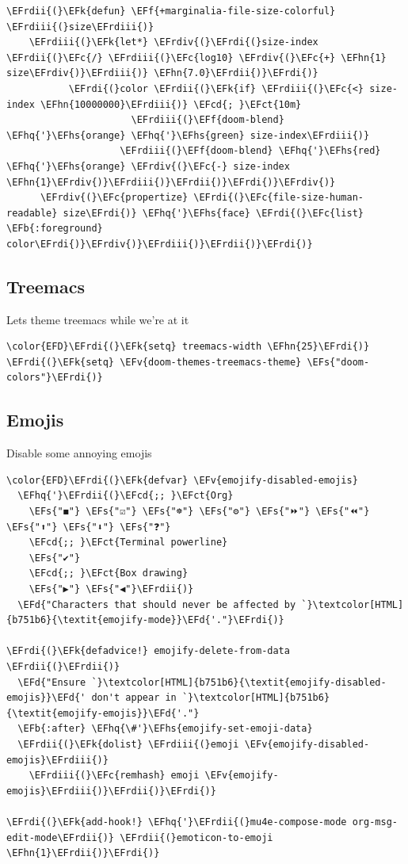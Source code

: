 \documentclass{scrartcl}
\newcommand{\EFk}[1]{\textcolor{EFk}{#1}} %
\newcommand{\EFd}[1]{\textcolor{EFd}{\textit{#1}}} %
\newcommand{\EFs}[1]{\textcolor{EFs}{#1}} %
\newcommand{\EFb}[1]{\textcolor{EFb}{#1}} %
\newcommand{\EFct}[1]{\textcolor{EFct}{#1}} %
\newcommand{\EFc}[1]{\textcolor{EFc}{#1}} %
\newcommand{\EFv}[1]{\textcolor{EFv}{#1}} %
\newcommand{\EFf}[1]{\textcolor{EFf}{#1}} %
\newcommand{\EFcd}[1]{\textcolor{EFcd}{#1}} %
\newcommand{\EFhn}[1]{\textcolor{EFhn}{\textbf{#1}}} %
\newcommand{\EFhq}[1]{\textcolor{EFhq}{#1}} %
\newcommand{\EFhs}[1]{\textcolor{EFhs}{#1}} %
\newcommand{\EFrdi}[1]{\textcolor{EFrdi}{#1}} %
\newcommand{\EFrdii}[1]{\textcolor{EFrdii}{#1}} %
\newcommand{\EFrdiii}[1]{\textcolor{EFrdiii}{#1}} %
\newcommand{\EFrdiv}[1]{\textcolor{EFrdiv}{#1}} %
\begin{document}
\begin{Code}
\begin{Verbatim}[]
  \EFrdii{(}\EFk{defun} \EFf{+marginalia-file-size-colorful} \EFrdiii{(}size\EFrdiii{)}
    \EFrdiii{(}\EFk{let*} \EFrdiv{(}\EFrdi{(}size-index \EFrdii{(}\EFc{/} \EFrdiii{(}\EFc{log10} \EFrdiv{(}\EFc{+} \EFhn{1} size\EFrdiv{)}\EFrdiii{)} \EFhn{7.0}\EFrdii{)}\EFrdi{)}
           \EFrdi{(}color \EFrdii{(}\EFk{if} \EFrdiii{(}\EFc{<} size-index \EFhn{10000000}\EFrdiii{)} \EFcd{; }\EFct{10m}
                      \EFrdiii{(}\EFf{doom-blend} \EFhq{'}\EFhs{orange} \EFhq{'}\EFhs{green} size-index\EFrdiii{)}
                    \EFrdiii{(}\EFf{doom-blend} \EFhq{'}\EFhs{red} \EFhq{'}\EFhs{orange} \EFrdiv{(}\EFc{-} size-index \EFhn{1}\EFrdiv{)}\EFrdiii{)}\EFrdii{)}\EFrdi{)}\EFrdiv{)}
      \EFrdiv{(}\EFc{propertize} \EFrdi{(}\EFc{file-size-human-readable} size\EFrdi{)} \EFhq{'}\EFhs{face} \EFrdi{(}\EFc{list} \EFb{:foreground} color\EFrdi{)}\EFrdiv{)}\EFrdiii{)}\EFrdii{)}\EFrdi{)}
\end{Verbatim}
\end{Code}

\subsection{Treemacs}
\label{sec:org0352200}
Lets theme treemacs while we're at it
\begin{Code}
\begin{Verbatim}[]
\color{EFD}\EFrdi{(}\EFk{setq} treemacs-width \EFhn{25}\EFrdi{)}
\EFrdi{(}\EFk{setq} \EFv{doom-themes-treemacs-theme} \EFs{"doom-colors"}\EFrdi{)}
\end{Verbatim}
\end{Code}

\subsection{Emojis}
\label{sec:org70b92b0}
Disable some annoying emojis
\begin{Code}
\begin{Verbatim}[]
\color{EFD}\EFrdi{(}\EFk{defvar} \EFv{emojify-disabled-emojis}
  \EFhq{'}\EFrdii{(}\EFcd{;; }\EFct{Org}
    \EFs{"◼"} \EFs{"☑"} \EFs{"☸"} \EFs{"⚙"} \EFs{"⏩"} \EFs{"⏪"} \EFs{"⬆"} \EFs{"⬇"} \EFs{"❓"}
    \EFcd{;; }\EFct{Terminal powerline}
    \EFs{"✔"}
    \EFcd{;; }\EFct{Box drawing}
    \EFs{"▶"} \EFs{"◀"}\EFrdii{)}
  \EFd{"Characters that should never be affected by `}\textcolor[HTML]{b751b6}{\textit{emojify-mode}}\EFd{'."}\EFrdi{)}

\EFrdi{(}\EFk{defadvice!} emojify-delete-from-data \EFrdii{(}\EFrdii{)}
  \EFd{"Ensure `}\textcolor[HTML]{b751b6}{\textit{emojify-disabled-emojis}}\EFd{' don't appear in `}\textcolor[HTML]{b751b6}{\textit{emojify-emojis}}\EFd{'."}
  \EFb{:after} \EFhq{\#'}\EFhs{emojify-set-emoji-data}
  \EFrdii{(}\EFk{dolist} \EFrdiii{(}emoji \EFv{emojify-disabled-emojis}\EFrdiii{)}
    \EFrdiii{(}\EFc{remhash} emoji \EFv{emojify-emojis}\EFrdiii{)}\EFrdii{)}\EFrdi{)}

\EFrdi{(}\EFk{add-hook!} \EFhq{'}\EFrdii{(}mu4e-compose-mode org-msg-edit-mode\EFrdii{)} \EFrdii{(}emoticon-to-emoji \EFhn{1}\EFrdii{)}\EFrdi{)}
\end{Verbatim}
\end{Code}
\end{document}
